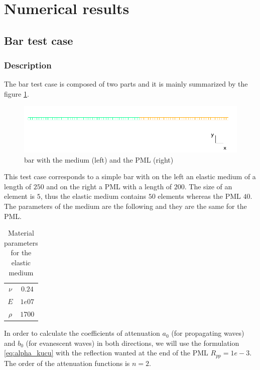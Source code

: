 \section{Numerical results}
\subsection{Bar test case}
\subsubsection{Description}
The bar test case is composed of two parts and it is mainly summarized by the figure \ref{fig:bar}. 
\begin{figure}[H]
  \centering
  \includegraphics[scale=0.6]{images/bar.png}
  \caption{bar with the medium (left) and the PML (right)}
  \label{fig:bar}
\end{figure}  
This test case corresponds to a simple bar with on the left an elastic medium of a length of $250$ and on the right a PML with a length of $200$. The size of an element is $5$, thus the elastic medium contains $50$ elements whereas the PML $40$. The parameters of the medium are the following and they are the same for the PML.
\begin{table}[H]
\centering
\caption{Material parameters for the elastic medium}
\begin{tabular}{c|c}
$\nu$ & $0.24$ \\
$E$ & $1e07$ \\
$\rho$ & $1700$ \\
\end{tabular}
\end{table} 
In order to calculate the coefficients of attenuation $a_0$ (for propagating waves) and $b_0$ (for evanescent waves) in both directions, we will use the formulation \ref{eq:alpha_kucu} with the reflection wanted at the end of the PML $R_{pp} = 1e-3$. The order of the attenuation functions is $n = 2$. \\
